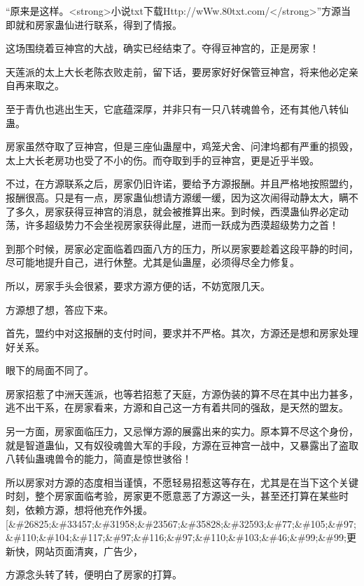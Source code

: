 
\begin{this_body}

“原来是这样。<strong>小说txt下载Http://wWw.80txt.com/</strong>”方源当即就和房家蛊仙进行联系，得到了情报。

这场围绕着豆神宫的大战，确实已经结束了。夺得豆神宫的，正是房家！

天莲派的太上大长老陈衣败走前，留下话，要房家好好保管豆神宫，将来他必定亲自再来取之。

至于青仇也逃出生天，它底蕴深厚，并非只有一只八转魂兽令，还有其他八转仙蛊。

房家虽然夺取了豆神宫，但是三座仙蛊屋中，鸡笼犬舍、问津坞都有严重的损毁，太上大长老房功也受了不小的伤。而夺取到手的豆神宫，更是近乎半毁。

不过，在方源联系之后，房家仍旧许诺，要给予方源报酬。并且严格地按照盟约，报酬很高。只是有一点，房家蛊仙想请方源缓一缓，因为这次闹得动静太大，瞒不了多久，房家获得豆神宫的消息，就会被推算出来。到时候，西漠蛊仙界必定动荡，许多超级势力不会坐视房家获得此屋，进而一跃成为西漠超级势力之首！

到那个时候，房家必定面临着四面八方的压力，所以房家要趁着这段平静的时间，尽可能地提升自己，进行休整。尤其是仙蛊屋，必须得尽全力修复。

所以，房家手头会很紧，要求方源方便的话，不妨宽限几天。

方源想了想，答应下来。

首先，盟约中对这报酬的支付时间，要求并不严格。其次，方源还是想和房家处理好关系。

眼下的局面不同了。

房家招惹了中洲天莲派，也等若招惹了天庭，方源伪装的算不尽在其中出力甚多，逃不出干系，在房家看来，方源和自己这一方有着共同的强敌，是天然的盟友。

另一方面，房家面临压力，又忌惮方源的展露出来的实力。原本算不尽这个身份，就是智道蛊仙，又有奴役魂兽大军的手段，方源在豆神宫一战中，又暴露出了盗取八转仙蛊魂兽令的能力，简直是惊世骇俗！

所以房家对方源的态度相当谨慎，不愿轻易招惹这等存在，尤其是在当下这个关键时刻，整个房家面临考验，房家更不愿意恶了方源这一头，甚至还打算在某些时刻，依赖方源，想将他充作外援。[\&\#26825;\&\#33457;\&\#31958;\&\#23567;\&\#35828;\&\#32593;\&\#77;\&\#105;\&\#97;\&\#110;\&\#104;\&\#117;\&\#97;\&\#116;\&\#97;\&\#110;\&\#103;\&\#46;\&\#99;\&\#99;更新快，网站页面清爽，广告少，

方源念头转了转，便明白了房家的打算。


\end{this_body}
